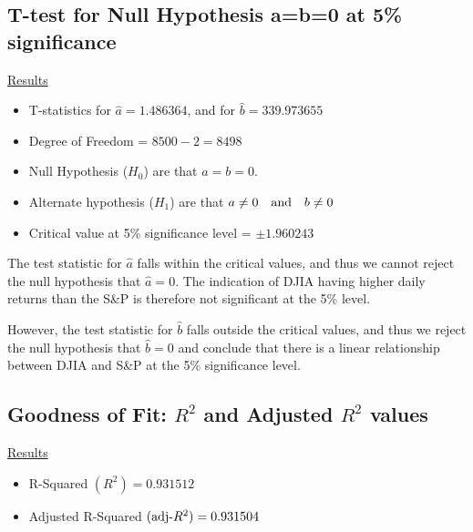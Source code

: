 \documentclass[a4paper]{article}
\begin{document}
	\subsection{T-test for Null Hypothesis a=b=0 at 5\% significance}
	\underline{Results}
	\begin{itemize}[nosep]
		\item T-statistics for $\hat{a} = 1.486364$, and for $\hat{b} = 339.973655$
		\item Degree of Freedom = $8500 - 2 = 8498$
		\item Null Hypothesis ($H_0$) are that $a=b=0$.
		\item Alternate hypothesis ($H_1$) are that $a\ne 0 \quad \textnormal{and} \quad b\ne 0$
		\item Critical value at 5\% significance level = $\pm1.960243$
	\end{itemize}
	
	\begin{comment}
	For $\hat{a}$, the test statistic lies within the 95\% confidence interval (i.e. does not exceed the 5\% critical level). Therefore, we do not reject the null hypothesis. The intercept coefficient $\hat{a}$ is not significantly different from 0 at the 5\% significance level.
	
	In contrast, for $\hat{b}$, the test statistic lies well beyond the 95\% confidence interval (i.e. significantly exceeds the 5\% critical level). Therefore, we reject the null hypothesis and accept the alternate hypothesis. The slope coefficient $\hat{b}$ is significantly different from 0 at the 5\% significance level.
	\end{comment}
	
	The test statistic for $\hat{a}$ falls within the critical values, and thus we cannot reject the null hypothesis that $\hat{a}=0$. The indication of DJIA having higher daily returns than the S\&P is therefore not significant at the 5\% level.  
	
	However, the test statistic for $\hat{b}$ falls outside the critical values, and thus we reject the null hypothesis that $\hat{b}=0$ and conclude that there is a linear relationship between DJIA and S\&P at the 5\% significance level. 
	
	
	\subsection{Goodness of Fit: $R^2$ and Adjusted $R^2$ values}
	\underline{Results}
	\begin{itemize}[nosep]
		\item R-Squared $(R^2) = 0.931512$
		\item Adjusted R-Squared $(\textnormal{adj-}R^2) = 0.931504$
	\end{itemize}
\end{document}
